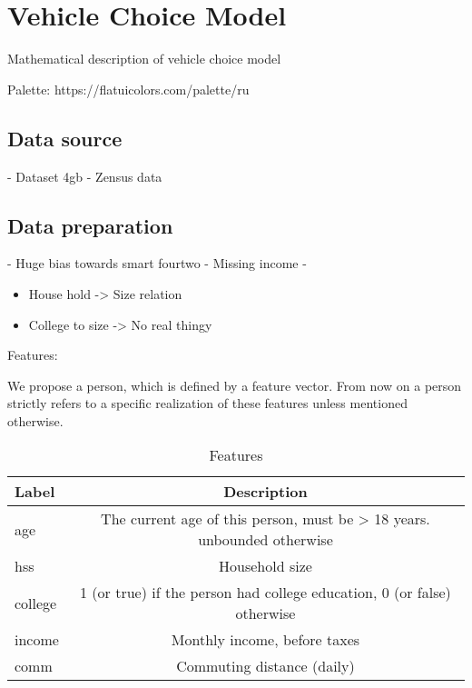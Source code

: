 \clearpage
\section{Vehicle Choice Model}
\label{sec:ChoiceModel}

Mathematical description of vehicle choice model

Palette: https://flatuicolors.com/palette/ru


\subsection{Data source}
\label{sub_sec:DataSource}

- Dataset 4gb
- Zensus data


\subsection{Data preparation}
\label{sub_sec:DataPreparation}

- Huge bias towards smart fourtwo
- Missing income
- 


\begin{itemize}
  \item House hold -> Size relation
  \item College to size -> No real thingy
\end{itemize}

Features:

We propose a person, which is defined by a feature vector. From now on a person strictly refers to a specific realization 
of these features unless mentioned otherwise. 

\begin{longtable}{l | c}
  \caption{Features}
  \label{table:features}
  \\
  \textbf{Label} & \textbf{Description} \\
  \hline
  age & The current age of this person, must be > 18 years. unbounded otherwise \\
  hss & Household size\\
  college & 1 (or true) if the person had college education, 0 (or false) otherwise \\
  income & Monthly income, before taxes \\
  comm & Commuting distance (daily)
\end{longtable}

